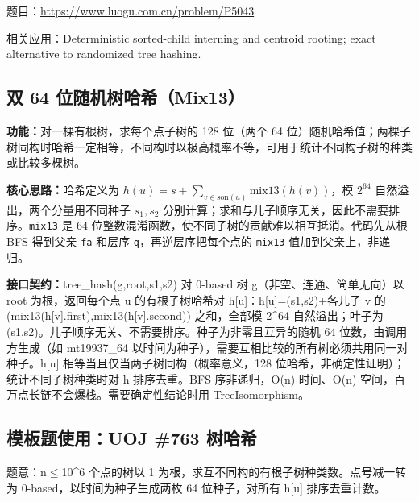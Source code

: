 题目：\url{https://www.luogu.com.cn/problem/P5043}



\Needspace{501pt}

\noindent 相关应用：Deterministic sorted-child interning and centroid rooting; exact alternative to randomized tree hashing.

\subsection{双 64 位随机树哈希（Mix13）}\label{compact-tree_hash}

\noindent\textbf{功能：}\allowbreak 对一棵有根树，求每个点子树的 128 位（两个 64 位）随机哈希值；两棵子树同构时哈希一定相等，不同构时以极高概率不等，可用于统计不同构子树的种类或比较多棵树。

\textbf{核心思路：}\allowbreak 哈希定义为 $h(u)=s+\sum_{v\in\mathrm{son}(u)}\mathrm{mix13}(h(v))$，模 $2^{64}$ 自然溢出，两个分量用不同种子 $s_1,s_2$ 分别计算；求和与儿子顺序无关，因此不需要排序。\texttt{mix13} 是 64 位整数混淆函数，使不同子树的贡献难以相互抵消。代码先从根 BFS 得到父亲 \texttt{fa} 和层序 \texttt{q}，再逆层序把每个点的 \texttt{mix13} 值加到父亲上，非递归。



{\sloppy{}\noindent\textbf{接口契约：}tree\_hash(g,root,s1,s2) 对 0-based 树 g（非空、连通、简单无向）以 root 为根，返回每个点 u 的有根子树哈希对 h[u]：h[u]=(s1,s2)+各儿子 v 的 (mix13(h[v].first),mix13(h[v].second)) 之和，全部模 2\textasciicircum{}64 自然溢出；叶子为 (s1,s2)。儿子顺序无关、不需要排序。种子为非零且互异的随机 64 位数，由调用方生成（如 mt19937\_64 以时间为种子），需要互相比较的所有树必须共用同一对种子。h[u] 相等当且仅当两子树同构（概率意义，128 位哈希，非确定性证明）；统计不同子树种类时对 h 排序去重。BFS 序非递归，O(n) 时间、O(n) 空间，百万点长链不会爆栈。需要确定性结论时用 TreeIsomorphism。\par}



\Needspace{365pt}

\subsection*{模板题使用：UOJ \#763 树哈希}

\label{usage-example-456}

题意：n$\le$10\textasciicircum{}6 个点的树以 1 为根，求互不同构的有根子树种类数。点号减一转为 0-based，以时间为种子生成两枚 64 位种子，对所有 h[u] 排序去重计数。

